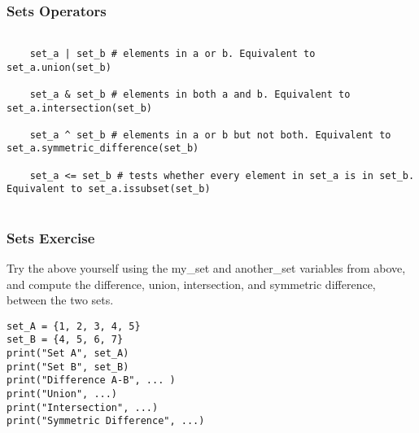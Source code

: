 \begin{frame}[fragile] \frametitle{Sets Operators}

  \begin{lstlisting}

    set_a | set_b # elements in a or b. Equivalent to set_a.union(set_b)
    
    set_a & set_b # elements in both a and b. Equivalent to set_a.intersection(set_b)
    
    set_a ^ set_b # elements in a or b but not both. Equivalent to set_a.symmetric_difference(set_b)
    
    set_a <= set_b # tests whether every element in set_a is in set_b. Equivalent to set_a.issubset(set_b)
    
\end{lstlisting}
\end{frame}


\begin{frame}[fragile] \frametitle{Sets Exercise}
Try the above yourself using the my\_set and another\_set variables from above, and compute the difference, union, intersection, and symmetric difference, between the two sets.
  \begin{lstlisting}
set_A = {1, 2, 3, 4, 5}
set_B = {4, 5, 6, 7}
print("Set A", set_A)
print("Set B", set_B)
print("Difference A-B", ... )
print("Union", ...)
print("Intersection", ...)
print("Symmetric Difference", ...)
\end{lstlisting}
\end{frame}

